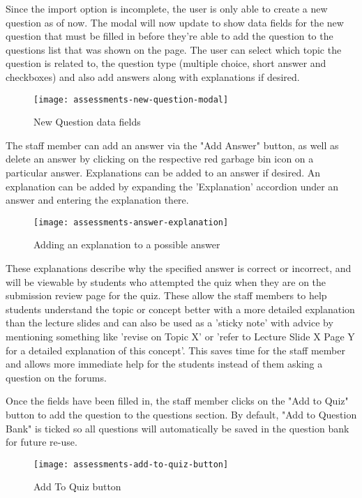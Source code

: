 Since the import option is incomplete, the user is only able to create a new question as of now. The modal will now update to show data fields for the new question that must be filled in before they're able to add the question to the questions list that was shown on the page. The user can select which topic the question is related to, the question type (multiple choice, short answer and checkboxes) and also add answers along with explanations if desired.

\begin{figure}[h!]
	\centering
	\texttt{[image: assessments-new-question-modal]}
	\caption{New Question data fields}
\end{figure}

The staff member can add an answer via the "Add Answer" button, as well as delete an answer by clicking on the respective red garbage bin icon on a particular answer. Explanations can be added to an answer if desired. An explanation can be added by expanding the 'Explanation' accordion under an answer and entering the explanation there.

\begin{figure}[h!]
	\centering
	\texttt{[image: assessments-answer-explanation]}
	\caption{Adding an explanation to a possible answer}
\end{figure}

These explanations describe why the specified answer is correct or incorrect, and will be viewable by students who attempted the quiz when they are on the submission review page for the quiz. These allow the staff members to help students understand the topic or concept better with a more detailed explanation than the lecture slides and can also be used as a 'sticky note' with advice by mentioning something like 'revise on Topic X' or 'refer to Lecture Slide X Page Y for a detailed explanation of this concept'. This saves time for the staff member and allows more immediate help for the students instead of them asking a question on the forums.

Once the fields have been filled in, the staff member clicks on the "Add to Quiz" button to add the question to the questions section. By default, "Add to Question Bank" is ticked so all questions will automatically be saved in the question bank for future re-use.

\begin{figure}[h!]
	\centering
	\texttt{[image: assessments-add-to-quiz-button]}
	\caption{Add To Quiz button}
\end{figure}

